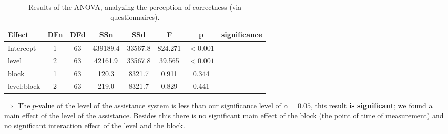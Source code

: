 		\begin{table}[H]\centering
			\caption{Results of the \ac{ANOVA}, analyzing the perception of correctness (via questionnaires).}
			\begin{tabular}{lccccccc}
				\toprule
				Effect & DFn & DFd & SSn & SSd & F & p & significance \\
				\midrule
				Intercept 	& 1 & 63 & 439189.4 & 33567.8 & 824.271 & \(< 0.001\) & \Checkmark \\
				level				& 2 & 63 & 42161.9 & 33567.8 & 39.565  & \(< 0.001\) & \Checkmark \\
				block 			& 1 & 63 & 120.3  & 8321.7 & 0.911  & 0.344 & \XSolidBrush \\
				level:block & 2 & 63 & 219.0 & 8321.7 & 0.829 	& 0.441 & \XSolidBrush \\
				\bottomrule
			\end{tabular}
			\label{tab:anovaQuestionnaireCorrectness}
		\end{table}
		\(\Rightarrow\) The \(p\)-value of the level of the assistance system is less than our significance level of \(\alpha = 0.05\), this result \textbf{is significant}; we found a main effect of the level of the assistance. Besides this there is no significant main effect of the block (the point of time of measurement) and no significant interaction effect of the level and the block.
